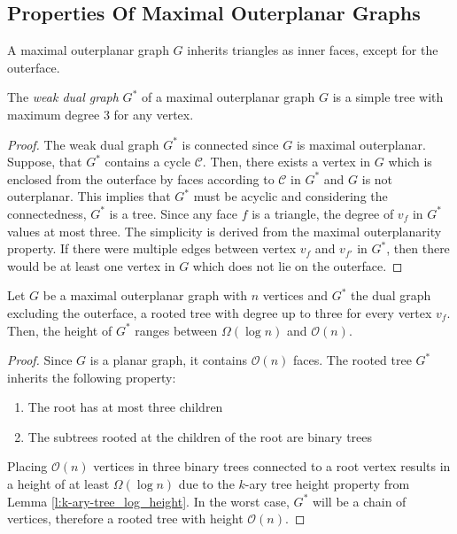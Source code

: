 \subsection{Properties Of Maximal Outerplanar Graphs}
\begin{lemma}
	A maximal outerplanar graph $G$ inherits triangles as inner faces, except for the outerface.
\end{lemma}
\begin{lemma}\label{l:outerplanar-dual-tree-degree-3}
	The \emph{weak dual graph} $G^*$ of a maximal outerplanar graph $G$ is a simple tree with maximum degree 3 for any vertex.
\end{lemma}
\begin{proof}
	The weak dual graph $G^*$ is connected since $G$ is maximal outerplanar. Suppose, that $G^*$ contains a cycle $\mathcal{C}$. Then, there exists a vertex in $G$ which is enclosed from the outerface by faces according to $\mathcal{C}$ in $G^*$ and $G$ is not outerplanar. This implies that $G^*$ must be acyclic and considering the connectedness, $G^*$ is a tree. Since any face $f$ is a triangle, the degree of $v_f$ in $G^*$ values at most three. The simplicity is derived from the maximal outerplanarity property. If there were multiple edges between vertex $v_f$ and $v_{f'}$ in $G^*$, then there would be at least one vertex in $G$ which does not lie on the outerface.
\end{proof}
\begin{lemma}
	Let $G$ be a maximal outerplanar graph with $n$ vertices and $G^*$ the dual graph excluding the outerface, a rooted tree with degree up to three for every vertex $v_f$. Then, the height of $G^*$ ranges between $\Omega(\log n)$ and $\mathcal{O}(n)$.
\end{lemma}
\begin{proof}
	Since $G$ is a planar graph, it contains $\mathcal{O}(n)$ faces. The rooted tree $G^*$ inherits the following property:
	\begin{enumerate}
		\item The root has at most three children
		\item The subtrees rooted at the children of the root are binary trees
	\end{enumerate}
	Placing $\mathcal{O}(n)$ vertices in three binary trees connected to a root vertex results in a height of at least $\Omega(\log n)$ due to the $k$-ary tree height property from Lemma \ref{l:k-ary-tree_log_height}. In the worst case, $G^*$ will be a chain of vertices, therefore a rooted tree with height $\mathcal{O}(n)$.
\end{proof}

